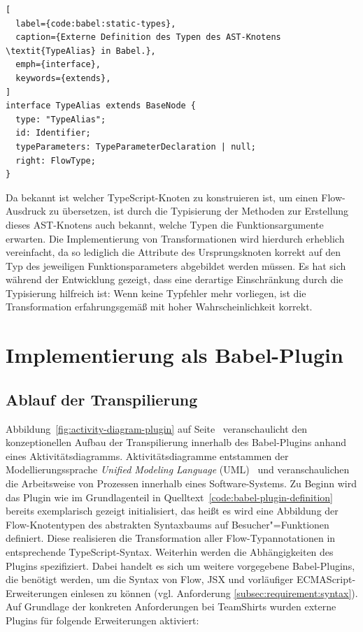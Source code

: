 {\begin{lstlisting}[
  label={code:babel:static-types},
  caption={Externe Definition des Typen des AST-Knotens \textit{TypeAlias} in Babel.},
  emph={interface},
  keywords={extends},
]
interface TypeAlias extends BaseNode {
  type: "TypeAlias";
  id: Identifier;
  typeParameters: TypeParameterDeclaration | null;
  right: FlowType;
}
\end{lstlisting}

Da bekannt ist welcher TypeScript-Knoten zu konstruieren ist, um einen Flow-Ausdruck zu übersetzen, ist durch die Typisierung der Methoden zur Erstellung dieses AST-Knotens auch bekannt, welche Typen die Funktionsargumente erwarten. Die Implementierung von Transformationen wird hierdurch erheblich vereinfacht, da so lediglich die Attribute des Ursprungsknoten korrekt auf den Typ des jeweiligen Funktionsparameters abgebildet werden müssen. Es hat sich während der Entwicklung gezeigt, dass eine derartige Einschränkung durch die Typisierung hilfreich ist: Wenn keine Typfehler mehr vorliegen, ist die Transformation erfahrungsgemäß mit hoher Wahrscheinlichkeit korrekt.

\section{Implementierung als Babel-Plugin}

\subsection{Ablauf der Transpilierung}

Abbildung~\ref{fig:activity-diagram-plugin} auf Seite~\pageref{fig:activity-diagram-plugin} veranschaulicht den konzeptionellen Aufbau der Transpilierung innerhalb des Babel-Plugins anhand eines Aktivitätsdiagramms. Aktivitätsdiagramme entstammen der Modellierungssprache \textit{Unified Modeling Language} (UML)~\autocite{OMG:UML} und veranschaulichen die Arbeitsweise von Prozessen innerhalb eines Software-Systems. Zu Beginn wird das Plugin wie im Grundlagenteil in Quelltext~\ref{code:babel-plugin-definition} bereits exemplarisch gezeigt initialisiert, das heißt es wird eine Abbildung der Flow-Knotentypen des abstrakten Syntaxbaums auf Besucher"=Funktionen definiert. Diese realisieren die Transformation aller Flow-Typannotationen in entsprechende TypeScript-Syntax.
Weiterhin werden die Abhängigkeiten des Plugins spezifiziert. Dabei handelt es sich um weitere vorgegebene Babel-Plugins, die benötigt werden, um die Syntax von Flow, JSX und vorläufiger ECMAScript-Erweiterungen einlesen zu können (vgl. Anforderung \ref{subsec:requirement:syntax}). Auf Grundlage der konkreten Anforderungen bei TeamShirts wurden externe Plugins für folgende Erweiterungen aktiviert:

}
